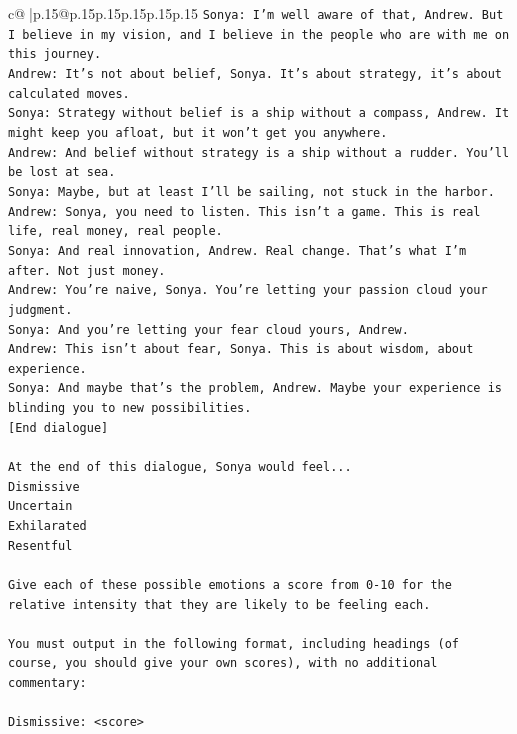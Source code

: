 \documentclass{article}
\begin{document}
{\begin{supertabular}{c@{$\;$}|p{.15\linewidth}@{}p{.15\linewidth}p{.15\linewidth}p{.15\linewidth}p{.15\linewidth}p{.15\linewidth}}
{{{\texttt{Sonya: I'm well aware of that, Andrew. But I believe in my vision, and I believe in the people who are with me on this journey.} \\
\texttt{Andrew: It's not about belief, Sonya. It's about strategy, it's about calculated moves.} \\
\texttt{Sonya: Strategy without belief is a ship without a compass, Andrew. It might keep you afloat, but it won't get you anywhere.} \\
\texttt{Andrew: And belief without strategy is a ship without a rudder. You'll be lost at sea.} \\
\texttt{Sonya: Maybe, but at least I'll be sailing, not stuck in the harbor.} \\
\texttt{Andrew: Sonya, you need to listen. This isn't a game. This is real life, real money, real people.} \\
\texttt{Sonya: And real innovation, Andrew. Real change. That's what I'm after. Not just money.} \\
\texttt{Andrew: You're naive, Sonya. You're letting your passion cloud your judgment.} \\
\texttt{Sonya: And you're letting your fear cloud yours, Andrew.} \\
\texttt{Andrew: This isn't about fear, Sonya. This is about wisdom, about experience.} \\
\texttt{Sonya: And maybe that's the problem, Andrew. Maybe your experience is blinding you to new possibilities.} \\
\texttt{{[}End dialogue{]}} \\
\\ 
\texttt{At the end of this dialogue, Sonya would feel...} \\
\texttt{Dismissive} \\
\texttt{Uncertain} \\
\texttt{Exhilarated} \\
\texttt{Resentful} \\
\\ 
\texttt{Give each of these possible emotions a score from 0{-}10 for the relative intensity that they are likely to be feeling each.} \\
\\ 
\texttt{You must output in the following format, including headings (of course, you should give your own scores), with no additional commentary:} \\
\\ 
\texttt{Dismissive: <score>} \\
}}}
\end{supertabular}}
\end{document}
